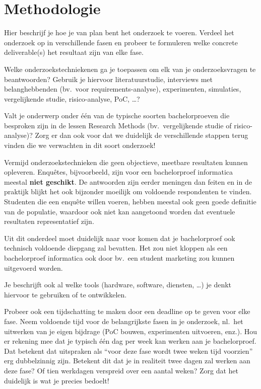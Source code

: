 \documentclass{hogent-article}
\begin{document}
\section{Methodologie}%
\label{sec:methodologie}


Hier beschrijf je hoe je van plan bent het onderzoek te voeren. Verdeel het onderzoek op in verschillende fasen en probeer te formuleren welke concrete deliverable(s) het resultaat zijn van elke fase.

Welke onderzoekstechniekenen ga je toepassen om elk van je onderzoeksvragen te beantwoorden? Gebruik je hiervoor literatuurstudie, interviews met belanghebbenden (bv.\ voor re\-quire\-ments-a\-na\-ly\-se), experimenten, simulaties, vergelijkende studie, risico-analyse, PoC, \ldots?

Valt je onderwerp onder één van de typische soorten bachelorproeven die besproken zijn in de lessen Research Methods (bv.\ vergelijkende studie of risico-analyse)? Zorg er dan ook voor dat we duidelijk de verschillende stappen terug vinden die we verwachten in dit soort onderzoek!

Vermijd onderzoekstechnieken die geen objectieve, meetbare resultaten kunnen opleveren. Enquêtes, bijvoorbeeld, zijn voor een bachelorproef informatica meestal \textbf{niet geschikt}. De antwoorden zijn eerder meningen dan feiten en in de praktijk blijkt het ook bijzonder moeilijk om voldoende respondenten te vinden. Studenten die een enquête willen voeren, hebben meestal ook geen goede definitie van de populatie, waardoor ook niet kan aangetoond worden dat eventuele resultaten representatief zijn.

Uit dit onderdeel moet duidelijk naar voor komen dat je bachelorproef ook technisch voldoen\-de diepgang zal bevatten. Het zou niet kloppen als een bachelorproef informatica ook door bv.\ een student marketing zou kunnen uitgevoerd worden.

Je beschrijft ook al welke tools (hardware, software, diensten, \ldots) je denkt hiervoor te gebruiken of te ontwikkelen.

Probeer ook een tijdschatting te maken door een deadline op te geven voor elke fase. Neem voldoende tijd voor de belangrijkste fasen in je onderzoek, nl.\ het uitwerken van je eigen bijdrage (PoC bouwen, experimenten uitvoeren, enz.). Hou er rekening mee dat je typisch één dag per week kan werken aan je bachelorproef. Dat betekent dat uitspraken als ``voor deze fase wordt twee weken tijd voorzien'' erg dubbelzinnig zijn. Betekent dit dat je in realiteit twee dagen zal werken aan deze fase? Of tien werkdagen verspreid over een aantal weken? Zorg dat het duidelijk is wat je precies bedoelt!
\end{document}
